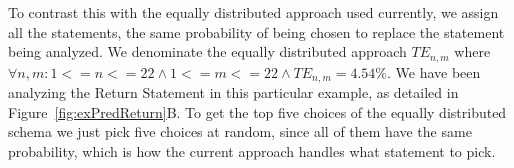 \documentclass[conference]{IEEEtran}
\begin{document}

To contrast this with the equally distributed approach used currently, 
we assign all the statements, the same probability of being chosen to replace 
the statement being analyzed. We denominate the equally distributed approach 
$TE_{n,m}$ where $\forall n,m: 1<=n<=22 \land 1<=m<=22 \land TE_{n,m} = 4.54\%$. 
We have been analyzing the Return Statement in this particular example, as 
detailed in Figure~\ref{fig:exPredReturn}B. To get the top five choices of the 
equally distributed schema we just pick five choices at random, since all of 
them have the same probability, which is how the current approach handles what 
statement to pick.


\end{document}
